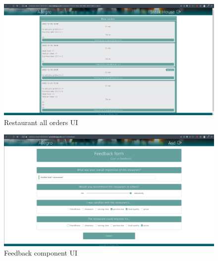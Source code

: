 \begin{figure}[ht]
	\centering
	\includegraphics[width=150mm, keepaspectratio]{figures/UI/13_Orders.png}
	\caption{Restaurant all orders UI} 
	\label{fig:UI_13}
\end{figure}

\begin{figure}[ht]
	\centering
	\includegraphics[width=150mm, keepaspectratio]{figures/UI/14_Feedback.png}
	\caption{Feedback component UI} 
	\label{fig:UI_14}
\end{figure}